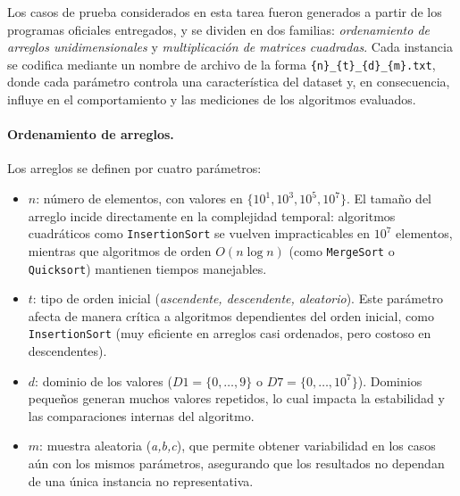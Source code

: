 Los casos de prueba considerados en esta tarea fueron generados a partir de los programas
oficiales entregados, y se dividen en dos familias: \textit{ordenamiento de arreglos unidimensionales} 
y \textit{multiplicación de matrices cuadradas}. Cada instancia se codifica mediante un nombre de archivo 
de la forma \texttt{\{n\}\_\{t\}\_\{d\}\_\{m\}.txt}, donde cada parámetro controla una característica 
del dataset y, en consecuencia, influye en el comportamiento y las mediciones de los algoritmos evaluados.

\paragraph{Ordenamiento de arreglos.} 
Los arreglos se definen por cuatro parámetros:
\begin{itemize}
    \item $n$: número de elementos, con valores en $\{10^1,10^3,10^5,10^7\}$. El tamaño del arreglo incide directamente 
    en la complejidad temporal: algoritmos cuadráticos como \texttt{InsertionSort} se vuelven impracticables 
    en $10^7$ elementos, mientras que algoritmos de orden $O(n\log n)$ (como \texttt{MergeSort} o \texttt{Quicksort}) 
    mantienen tiempos manejables.
    \item $t$: tipo de orden inicial (\textit{ascendente, descendente, aleatorio}). Este parámetro afecta de manera 
    crítica a algoritmos dependientes del orden inicial, como \texttt{InsertionSort} (muy eficiente en arreglos 
    casi ordenados, pero costoso en descendentes).
    \item $d$: dominio de los valores ($D1=\{0,\dots,9\}$ o $D7=\{0,\dots,10^7\}$). Dominios pequeños generan 
    muchos valores repetidos, lo cual impacta la estabilidad y las comparaciones internas del algoritmo.
    \item $m$: muestra aleatoria (\textit{a,b,c}), que permite obtener variabilidad en los casos aún con los mismos 
    parámetros, asegurando que los resultados no dependan de una única instancia no representativa.
\end{itemize}

